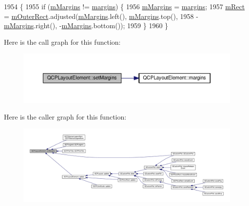 \begin{DoxyCode}
1954                                                          \{
1955   \textcolor{keywordflow}{if} (\hyperlink{class_q_c_p_layout_element_ac2a32b99ee527ca5dfff9da03628fe94}{mMargins} != \hyperlink{class_q_c_p_layout_element_a85ff977dfcced84eef32d9f819ec9543}{margins}) \{
1956     \hyperlink{class_q_c_p_layout_element_ac2a32b99ee527ca5dfff9da03628fe94}{mMargins} = \hyperlink{class_q_c_p_layout_element_a85ff977dfcced84eef32d9f819ec9543}{margins};
1957     \hyperlink{class_q_c_p_layout_element_ad8896f05550389f7b9e92c9e6cdf6e01}{mRect} = \hyperlink{class_q_c_p_layout_element_a07bb4973379e75cb0fa5b032c1d24afd}{mOuterRect}.adjusted(\hyperlink{class_q_c_p_layout_element_ac2a32b99ee527ca5dfff9da03628fe94}{mMargins}.left(), \hyperlink{class_q_c_p_layout_element_ac2a32b99ee527ca5dfff9da03628fe94}{mMargins}.top(),
1958                                 -\hyperlink{class_q_c_p_layout_element_ac2a32b99ee527ca5dfff9da03628fe94}{mMargins}.right(), -\hyperlink{class_q_c_p_layout_element_ac2a32b99ee527ca5dfff9da03628fe94}{mMargins}.bottom());
1959   \}
1960 \}
\end{DoxyCode}


Here is the call graph for this function\+:\nopagebreak
\begin{figure}[H]
\begin{center}
\leavevmode
\includegraphics[width=350pt]{class_q_c_p_layout_element_a8f450b1f3f992ad576fce2c63d8b79cf_cgraph}
\end{center}
\end{figure}




Here is the caller graph for this function\+:\nopagebreak
\begin{figure}[H]
\begin{center}
\leavevmode
\includegraphics[width=350pt]{class_q_c_p_layout_element_a8f450b1f3f992ad576fce2c63d8b79cf_icgraph}
\end{center}
\end{figure}


